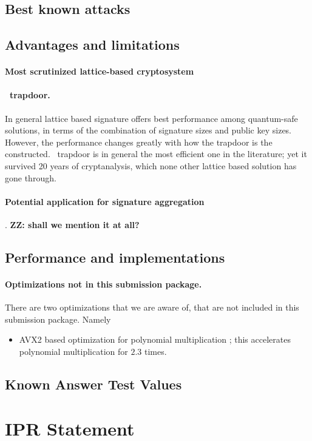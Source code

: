 \documentclass{llncs}
\newcommand{\ntru}{{\sf{NTRU}}}
\newcommand{\<}{\langle}
\renewcommand{\>}{\rangle}
\begin{document}
\subsection{Best known attacks}\label{sec:known_attack_security}




\subsection{Advantages and limitations}
\paragraph{Most scrutinized lattice-based cryptosystem}


\paragraph{\ntru~trapdoor.}
In general lattice based signature offers best performance among quantum-safe solutions, in terms of the combination of signature 
sizes and public key sizes. However, the performance changes greatly 
with how the trapdoor is the constructed. \ntru~trapdoor is in 
general the most efficient one in the literature;  yet it survived
20 years of cryptanalysis, which none other lattice based solution 
has gone through.



\paragraph{Potential application for signature aggregation}. {\bf ZZ: shall we mention it at all?}
\subsection{Performance and implementations}

\paragraph{Optimizations not in this submission package.}
There are two optimizations that we are aware of, that are not 
included in this submission package. Namely
\begin{itemize}
\item AVX2 based optimization for polynomial multiplication \cite{ntrutoc}; this accelerates polynomial multiplication for $2.3$ times.
\end{itemize}


\subsection{Known Answer Test Values}




\section{IPR Statement}



\end{document}
